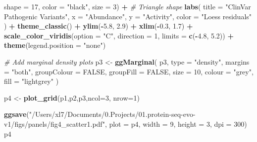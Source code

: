 \documentclass[
]{article}
\newenvironment{Shaded}{\begin{snugshade}}{\end{snugshade}}
\newcommand{\AttributeTok}[1]{\textcolor[rgb]{0.13,0.29,0.53}{#1}}
\newcommand{\CommentTok}[1]{\textcolor[rgb]{0.56,0.35,0.01}{\textit{#1}}}
\newcommand{\ConstantTok}[1]{\textcolor[rgb]{0.56,0.35,0.01}{#1}}
\newcommand{\DecValTok}[1]{\textcolor[rgb]{0.00,0.00,0.81}{#1}}
\newcommand{\FloatTok}[1]{\textcolor[rgb]{0.00,0.00,0.81}{#1}}
\newcommand{\FunctionTok}[1]{\textcolor[rgb]{0.13,0.29,0.53}{\textbf{#1}}}
\newcommand{\NormalTok}[1]{#1}
\newcommand{\OtherTok}[1]{\textcolor[rgb]{0.56,0.35,0.01}{#1}}
\newcommand{\SpecialCharTok}[1]{\textcolor[rgb]{0.81,0.36,0.00}{\textbf{#1}}}
\newcommand{\StringTok}[1]{\textcolor[rgb]{0.31,0.60,0.02}{#1}}
\begin{document}
\begin{Shaded}
\begin{Highlighting}[]
             \AttributeTok{shape =} \DecValTok{17}\NormalTok{, }\AttributeTok{color =} \StringTok{"black"}\NormalTok{, }\AttributeTok{size =} \DecValTok{3}\NormalTok{) }\SpecialCharTok{+}  \CommentTok{\# Triangle shape}
  \FunctionTok{labs}\NormalTok{(}
    \AttributeTok{title =} \StringTok{"ClinVar Pathogenic Variants"}\NormalTok{,}
    \AttributeTok{x =} \StringTok{"Abundance"}\NormalTok{,}
    \AttributeTok{y =} \StringTok{"Activity"}\NormalTok{,}
    \AttributeTok{color =} \StringTok{"Loess residuals"}
\NormalTok{  ) }\SpecialCharTok{+}
  \FunctionTok{theme\_classic}\NormalTok{() }\SpecialCharTok{+}
  \FunctionTok{ylim}\NormalTok{(}\SpecialCharTok{{-}}\FloatTok{5.8}\NormalTok{, }\FloatTok{2.9}\NormalTok{) }\SpecialCharTok{+} \FunctionTok{xlim}\NormalTok{(}\SpecialCharTok{{-}}\FloatTok{0.3}\NormalTok{, }\FloatTok{1.7}\NormalTok{) }\SpecialCharTok{+}
  \FunctionTok{scale\_color\_viridis}\NormalTok{(}\AttributeTok{option =} \StringTok{"C"}\NormalTok{, }\AttributeTok{direction =} \DecValTok{1}\NormalTok{, }\AttributeTok{limits =} \FunctionTok{c}\NormalTok{(}\SpecialCharTok{{-}}\FloatTok{4.8}\NormalTok{, }\FloatTok{5.2}\NormalTok{)) }\SpecialCharTok{+}
  \FunctionTok{theme}\NormalTok{(}\AttributeTok{legend.position =} \StringTok{"none"}\NormalTok{)}

\CommentTok{\# Add marginal density plots}
\NormalTok{p3 }\OtherTok{\textless{}{-}} \FunctionTok{ggMarginal}\NormalTok{(}
\NormalTok{  p3,}
  \AttributeTok{type =} \StringTok{"density"}\NormalTok{,}
  \AttributeTok{margins =} \StringTok{"both"}\NormalTok{,}
  \AttributeTok{groupColour =} \ConstantTok{FALSE}\NormalTok{,}
  \AttributeTok{groupFill =} \ConstantTok{FALSE}\NormalTok{,}
  \AttributeTok{size =} \DecValTok{10}\NormalTok{,}
  \AttributeTok{colour =} \StringTok{"grey"}\NormalTok{,}
  \AttributeTok{fill =} \StringTok{"lightgrey"}
\NormalTok{)}

\NormalTok{p4 }\OtherTok{\textless{}{-}} \FunctionTok{plot\_grid}\NormalTok{(p1,p2,p3,}\AttributeTok{ncol=}\DecValTok{3}\NormalTok{, }\AttributeTok{nrow=}\DecValTok{1}\NormalTok{)}

\FunctionTok{ggsave}\NormalTok{(}\StringTok{"/Users/xl7/Documents/0.Projects/01.protein{-}seq{-}evo{-}v1/figs/panels/fig4\_scatter1.pdf"}\NormalTok{, }
       \AttributeTok{plot =}\NormalTok{ p4, }\AttributeTok{width =} \DecValTok{9}\NormalTok{, }\AttributeTok{height =} \DecValTok{3}\NormalTok{, }\AttributeTok{dpi =} \DecValTok{300}\NormalTok{)}
\NormalTok{p4}
\end{Highlighting}
\end{Shaded}
\end{document}

